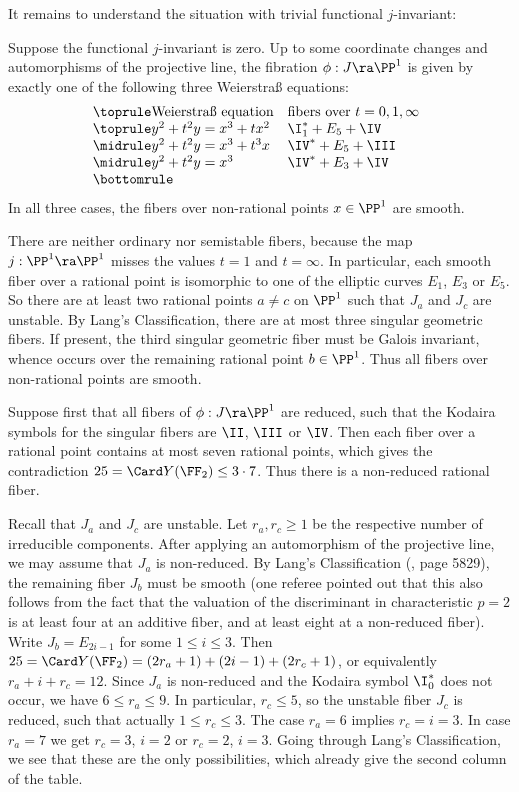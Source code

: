 It remains to understand the situation with trivial functional $j$-invariant:

\begin{theorem}
\notready
\label{classification  zero j}
Suppose the functional $j$-invariant is zero.
Up to some coordinate changes and automorphisms of the projective line,
the fibration $\phi:J\ra\PP^1$ is given by exactly one of the following three Weierstra\ss{} equations:
$$
\begin{array}[c]{@{}ll}
\toprule
\text{\rm Weierstra\ss{} equation}		& \text{\rm fibers over $t=0,1,\infty$}\\
\toprule
y^2+t^2y=x^3+tx^2			& \I_1^*+E_5+\IV\\
\midrule
y^2+t^2y=x^3+t^3x 			& \IV^*+E_5+\III\\
\midrule
y^2+t^2y=x^3 			& \IV^*+E_3+\IV\\
\bottomrule
\end{array}
$$
In all three cases, the fibers over non-rational points $x\in\PP^1$ are smooth.
\end{theorem}

\proof
There are neither ordinary nor semistable fibers, because the  map $j:\PP^1\ra\PP^1$ misses
the values $t=1$ and $t=\infty$. In particular, each smooth fiber  over a rational point
is isomorphic to one of the elliptic curves $E_1$, $E_3$ or $E_5$. So there are
at least two rational points $a\neq c$ on $\PP^1$ such that $J_a$ and $J_c$ are unstable.
By Lang's Classification, there are at most three singular geometric fibers. If present,
the third singular geometric fiber must be Galois invariant, whence occurs over
the remaining rational point $b\in\PP^1$. Thus all fibers over non-rational points are smooth.

Suppose first that all fibers of $\phi:J\ra\PP^1$ are reduced, such that the Kodaira symbols for
the singular fibers are $\II$, $\III$ or $\IV$. Then each fiber over  a rational point contains
at most seven rational points, which gives the contradiction $25=\Card Y(\FF_2)\leq 3\cdot 7$.
Thus there is a non-reduced rational fiber.

Recall that $J_a$ and $J_c$ are unstable. Let $r_a,r_c\geq 1$ be the respective number of irreducible components.
After applying an automorphism of the projective line, we may assume that $J_a $  is non-reduced.
By Lang's Classification (\cite{Lang-2000}, page 5829), the remaining fiber $J_b$ must be smooth
(one referee pointed out that this also follows from the fact that the valuation of the discriminant
in characteristic $p=2$ is at least four at an additive fiber, and at least eight at a non-reduced fiber).
Write $J_b=E_{2i-1}$ for some $1\leq i\leq 3$.
Then $25=\Card Y(\FF_2) = (2r_a+1) +(2i-1) + (2r_c+1) $, or equivalently $r_a+i+r_c=12$.
Since $J_a$ is non-reduced and the Kodaira symbol $\I_0^*$ does not occur, we have $6\leq r_a\leq 9$.
In particular, $r_c\leq 5$, so the unstable fiber $J_c$ is reduced, such that actually $1\leq r_c\leq 3$.
The case $r_a=6$ implies $r_c=i=3$. In case $r_a=7$ we get $r_c=3$, $i=2$ or $r_c=2$, $i=3$.
Going through Lang's Classification, we see that these are the only possibilities,
which already give the second column of the table.

